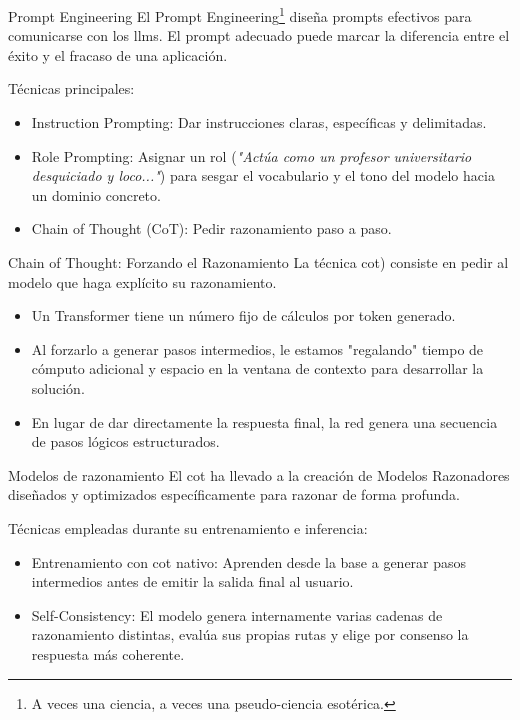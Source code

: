 \begin{frame}{Prompt Engineering}
El \alert{Prompt Engineering}\footnote{A veces una ciencia, a veces una pseudo-ciencia esotérica.} diseña prompts efectivos para comunicarse con los \glspl{llm}. El prompt adecuado puede marcar la diferencia entre el éxito y el fracaso de una aplicación.

Técnicas principales:
\begin{itemize}
    \item \alert{Instruction Prompting:} Dar instrucciones claras, específicas y delimitadas.
    \item \alert{Role Prompting:} Asignar un rol (\textit{"Actúa como un profesor universitario desquiciado y loco..."}) para sesgar el vocabulario y el tono del modelo hacia un dominio concreto.
    \item \alert{Chain of Thought (CoT):} Pedir razonamiento paso a paso.
\end{itemize}
\end{frame}

\begin{frame}{Chain of Thought: Forzando el Razonamiento}
La técnica \alert{\gls{cot})} \cite{wei2022chain} consiste en pedir al modelo que haga explícito su \alert{razonamiento}.

\begin{itemize}
    \item Un Transformer tiene un \alert{número fijo de cálculos} por token generado.
    \item Al forzarlo a generar pasos intermedios, le estamos "regalando" \alert{tiempo de cómputo adicional} y espacio en la \alert{ventana de contexto} para desarrollar la solución.
    \item En lugar de dar directamente la respuesta final, la red genera una secuencia de pasos lógicos estructurados.
\end{itemize}
\end{frame}

\begin{frame}{Modelos de razonamiento}
El \gls{cot} ha llevado a la creación de \alert{Modelos Razonadores} diseñados y optimizados específicamente para razonar de forma profunda.

Técnicas empleadas durante su entrenamiento e inferencia:
\begin{itemize}
    \item \alert{Entrenamiento con \gls{cot} nativo:} Aprenden desde la base a generar pasos intermedios antes de emitir la salida final al usuario.
    \item \alert{Self-Consistency:} El modelo genera internamente varias cadenas de razonamiento distintas, evalúa sus propias rutas y elige por consenso la respuesta más coherente.
\end{itemize}
\end{frame}

